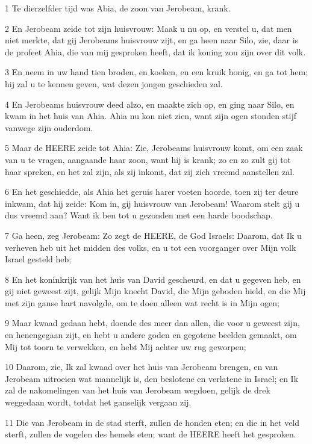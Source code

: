 \par 1 Te dierzelfder tijd was Abia, de zoon van Jerobeam, krank.
\par 2 En Jerobeam zeide tot zijn huisvrouw: Maak u nu op, en verstel u, dat men niet merkte, dat gij Jerobeams huisvrouw zijt, en ga heen naar Silo, zie, daar is de profeet Ahia, die van mij gesproken heeft, dat ik koning zou zijn over dit volk.
\par 3 En neem in uw hand tien broden, en koeken, en een kruik honig, en ga tot hem; hij zal u te kennen geven, wat dezen jongen geschieden zal.
\par 4 En Jerobeams huisvrouw deed alzo, en maakte zich op, en ging naar Silo, en kwam in het huis van Ahia. Ahia nu kon niet zien, want zijn ogen stonden stijf vanwege zijn ouderdom.
\par 5 Maar de HEERE zeide tot Ahia: Zie, Jerobeams huisvrouw komt, om een zaak van u te vragen, aangaande haar zoon, want hij is krank; zo en zo zult gij tot haar spreken, en het zal zijn, als zij inkomt, dat zij zich vreemd aanstellen zal.
\par 6 En het geschiedde, als Ahia het geruis harer voeten hoorde, toen zij ter deure inkwam, dat hij zeide: Kom in, gij huisvrouw van Jerobeam! Waarom stelt gij u dus vreemd aan? Want ik ben tot u gezonden met een harde boodschap.
\par 7 Ga heen, zeg Jerobeam: Zo zegt de HEERE, de God Israels: Daarom, dat Ik u verheven heb uit het midden des volks, en u tot een voorganger over Mijn volk Israel gesteld heb;
\par 8 En het koninkrijk van het huis van David gescheurd, en dat u gegeven heb, en gij niet geweest zijt, gelijk Mijn knecht David, die Mijn geboden hield, en die Mij met zijn ganse hart navolgde, om te doen alleen wat recht is in Mijn ogen;
\par 9 Maar kwaad gedaan hebt, doende des meer dan allen, die voor u geweest zijn, en henengegaan zijt, en hebt u andere goden en gegotene beelden gemaakt, om Mij tot toorn te verwekken, en hebt Mij achter uw rug geworpen;
\par 10 Daarom, zie, Ik zal kwaad over het huis van Jerobeam brengen, en van Jerobeam uitroeien wat mannelijk is, den beslotene en verlatene in Israel; en Ik zal de nakomelingen van het huis van Jerobeam wegdoen, gelijk de drek weggedaan wordt, totdat het ganselijk vergaan zij.
\par 11 Die van Jerobeam in de stad sterft, zullen de honden eten; en die in het veld sterft, zullen de vogelen des hemels eten; want de HEERE heeft het gesproken.
